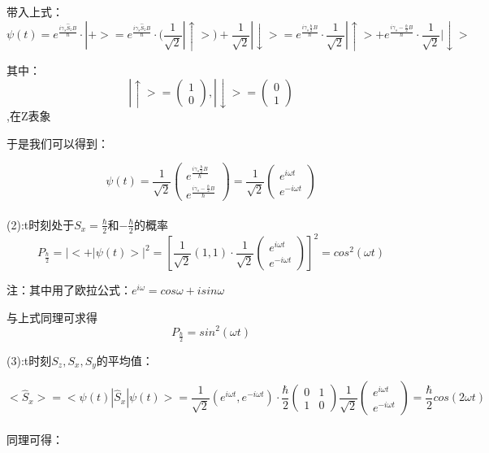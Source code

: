 \documentclass[UTF8]{ctexart}
\begin{document}
带入上式：
\[\psi(t) = e^{\frac{i \gamma_s \hat{S}_z B}{\hbar}} \cdot|+> = e^{\frac{i \gamma_s \hat{S}_z B}{\hbar}} 
\cdot (\frac{1}{\sqrt{2}} |\uparrow>) + \frac{1}{\sqrt{2}} |\downarrow> 
= e^{\frac{i \gamma_s \frac{\hbar}{2} B}{\hbar}} \cdot \frac{1}{\sqrt{2}} |\uparrow>
+e^{\frac{i \gamma_s -\frac{\hbar}{2} B}{\hbar}} \cdot \frac{1}{\sqrt{2}} |\downarrow>\]

其中：
\[
    |\uparrow> = \begin{pmatrix}
1 \\
0 
\end{pmatrix},
    |\downarrow> = \begin{pmatrix}
0 \\
1 
\end{pmatrix}
\],在Z表象

于是我们可以得到：


\[
    \psi(t) = \frac{1}{\sqrt{2}}
    \begin{pmatrix}
e^{\frac{i \gamma_s \frac{\hbar}{2} B}{\hbar}} \\
e^{\frac{i \gamma_s -\frac{\hbar}{2} B}{\hbar}} 
\end{pmatrix}
    =
    \frac{1}{\sqrt{2}} 
    \begin{pmatrix}
e^{i \omega t} \\
e^{-i \omega t} 
\end{pmatrix}
\]\\

(2):t时刻处于$S_x=\frac{\hbar}{2}$和$-\frac{\hbar}{2}$的概率
\[  
    P_{\frac{\hbar}{2}} = | <+|\psi(t)> |^2
    = [\frac{1}{\sqrt{2}}(1,1)\cdot \frac{1}{\sqrt{2}}
    \begin{pmatrix}
e^{i \omega t} \\
e^{-i \omega t} 
\end{pmatrix}]^2
    =cos^2(\omega t)
\]

注：其中用了欧拉公式：$e^{i\omega}=cos\omega + isin\omega$

与上式同理可求得
\[
    P_{\frac{\hbar}{2}}=sin^2(\omega t)
\]

(3):t时刻$S_z,S_x,S_y$的平均值：

\[
 <\hat{S}_x> = < \psi(t)| \hat{S}_x |\psi(t) >
 = \frac{1}{\sqrt{2}}(e^{i \omega t},e^{-i \omega t}) \cdot \frac{\hbar}{2} 
 \begin{pmatrix}
  0&1 \\
  1&0
\end{pmatrix}
 \frac{1}{\sqrt{2}}
  \begin{pmatrix}
   e^{i \omega t}\\
  e^{-i \omega t}
\end{pmatrix}
    = \frac{\hbar}{2} cos(2\omega t)
\]\\
同理可得：
\end{document}
